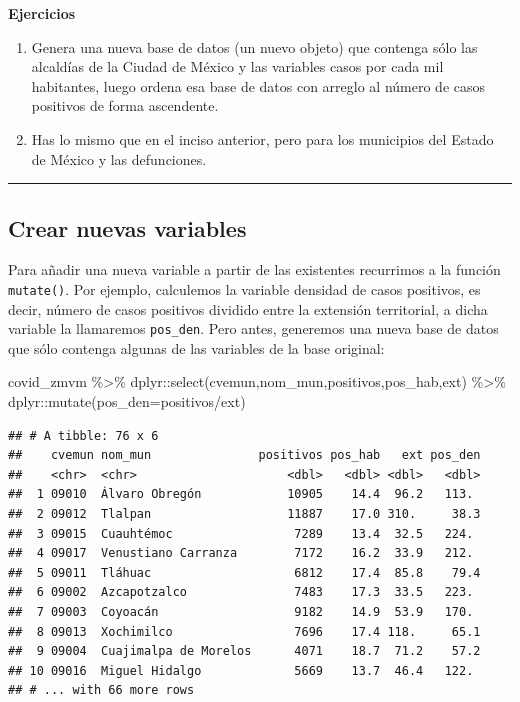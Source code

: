 \documentclass[
  11pt,
  oneside]{book}
\newenvironment{Shaded}{\begin{snugshade}}{\end{snugshade}}
\newcommand{\AttributeTok}[1]{\textcolor[rgb]{0.77,0.63,0.00}{#1}}
\newcommand{\FunctionTok}[1]{\textcolor[rgb]{0.00,0.00,0.00}{#1}}
\newcommand{\NormalTok}[1]{#1}
\newcommand{\SpecialCharTok}[1]{\textcolor[rgb]{0.00,0.00,0.00}{#1}}
\begin{document}
\textbf{Ejercicios}

\begin{enumerate}
\def\labelenumi{\roman{enumi})}
\item
  Genera una nueva base de datos (un nuevo objeto) que contenga sólo las alcaldías de la Ciudad de México y las variables casos por cada mil habitantes, luego ordena esa base de datos con arreglo al número de casos positivos de forma ascendente.
\item
  Has lo mismo que en el inciso anterior, pero para los municipios del Estado de México y las defunciones.
\end{enumerate}

\begin{center}\rule{0.5\linewidth}{0.5pt}\end{center}

\hypertarget{crear-nuevas-variables}{%
\subsection{Crear nuevas variables}\label{crear-nuevas-variables}}

Para añadir una nueva variable a partir de las existentes recurrimos a la función \texttt{mutate()}. Por ejemplo, calculemos la variable densidad de casos positivos, es decir, número de casos positivos dividido entre la extensión territorial, a dicha variable la llamaremos \texttt{pos\_den}. Pero antes, generemos una nueva base de datos que sólo contenga algunas de las variables de la base original:

\begin{Shaded}
\begin{Highlighting}[]
\NormalTok{covid\_zmvm }\SpecialCharTok{\%\textgreater{}\%}\NormalTok{ dplyr}\SpecialCharTok{::}\FunctionTok{select}\NormalTok{(cvemun,nom\_mun,positivos,pos\_hab,ext) }\SpecialCharTok{\%\textgreater{}\%}
\NormalTok{  dplyr}\SpecialCharTok{::}\FunctionTok{mutate}\NormalTok{(}\AttributeTok{pos\_den=}\NormalTok{positivos}\SpecialCharTok{/}\NormalTok{ext)}
\end{Highlighting}
\end{Shaded}

\begin{verbatim}
## # A tibble: 76 x 6
##    cvemun nom_mun               positivos pos_hab   ext pos_den
##    <chr>  <chr>                     <dbl>   <dbl> <dbl>   <dbl>
##  1 09010  Álvaro Obregón            10905    14.4  96.2   113. 
##  2 09012  Tlalpan                   11887    17.0 310.     38.3
##  3 09015  Cuauhtémoc                 7289    13.4  32.5   224. 
##  4 09017  Venustiano Carranza        7172    16.2  33.9   212. 
##  5 09011  Tláhuac                    6812    17.4  85.8    79.4
##  6 09002  Azcapotzalco               7483    17.3  33.5   223. 
##  7 09003  Coyoacán                   9182    14.9  53.9   170. 
##  8 09013  Xochimilco                 7696    17.4 118.     65.1
##  9 09004  Cuajimalpa de Morelos      4071    18.7  71.2    57.2
## 10 09016  Miguel Hidalgo             5669    13.7  46.4   122. 
## # ... with 66 more rows
\end{verbatim}
\end{document}
